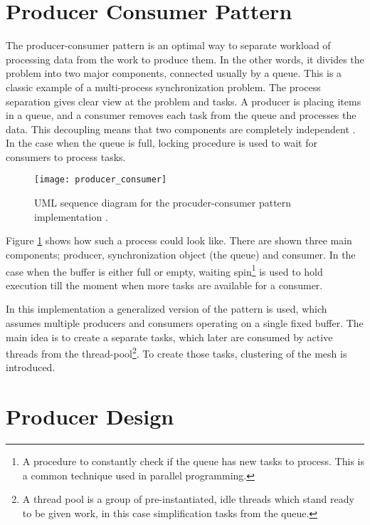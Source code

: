 \section{Producer Consumer Pattern}

The producer-consumer pattern is an optimal way to separate workload of processing data from the work to produce them. In the other words, it divides the problem into two major components, connected usually by a queue. This is a classic example of a multi-process synchronization problem. The process separation gives clear view at the problem and tasks. A producer is placing items in a queue, and a consumer removes each task from the queue and processes the data. This decoupling means that two components are completely independent \cite{grand02}. In the case when the queue is full, locking procedure is used to wait for consumers to process tasks.

\begin{figure}[H]
  \begin{center}
    \texttt{[image: producer\_consumer]}
    \caption{UML sequence diagram for the procuder-consumer pattern implementation \cite{ropero17}.}
    \label{fig:uml}
  \end{center}
\end{figure}

Figure \ref{fig:uml} shows how such a process could look like. There are shown three main components; producer, synchronization object (the queue) and consumer. In the case when the buffer is either full or empty, waiting spin\footnote{A procedure to constantly check if the queue has new tasks to process. This is a common technique used in parallel programming.} is used to hold execution till the moment when more tasks are available for a consumer.

In this implementation a generalized version of the pattern is used, which assumes multiple producers and consumers operating on a single fixed buffer. The main idea is to create a separate tasks, which later are consumed by active threads from the thread-pool\footnote{A thread pool is a group of pre-instantiated, idle threads which stand ready to be given work, in this case simplification tasks from the queue.}. To create those tasks, clustering of the mesh is introduced.

\newpage
\section{Producer Design}

